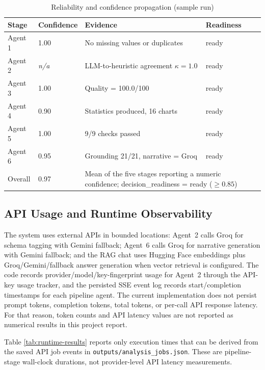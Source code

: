 \documentclass[12pt,a4paper,openany]{report}
\begin{document}
\begin{table}[H]
\centering
\caption{Reliability and confidence propagation (sample run)}
\label{tab:reliability-results}
\begin{tabular}{p{2.5cm} p{2.5cm} p{5.5cm} p{2.5cm}}
\hline
Stage & Confidence & Evidence & Readiness \\
\hline
Agent 1 & 1.00 & No missing values or duplicates & ready \\
Agent 2 & \textit{n/a} & LLM-to-heuristic agreement $\kappa=1.0$ & ready \\
Agent 3 & 1.00 & Quality = 100.0/100 & ready \\
Agent 4 & 0.90 & Statistics produced, 16 charts & ready \\
Agent 5 & 1.00 & 9/9 checks passed & ready \\
Agent 6 & 0.95 & Grounding 21/21, narrative = Groq & ready \\
\hline
Overall & 0.97 & \multicolumn{2}{p{8cm}}{Mean of the five stages reporting a numeric confidence; decision\_readiness = ready ($\ge 0.85$)} \\
\hline
\end{tabular}
\end{table}

\subsection{API Usage and Runtime Observability}
The system uses external APIs in bounded locations: Agent~2 calls Groq for schema tagging with Gemini fallback; Agent~6 calls Groq for narrative generation with Gemini fallback; and the RAG chat uses Hugging Face embeddings plus Groq/Gemini/fallback answer generation when vector retrieval is configured. The code records provider/model/key-fingerprint usage for Agent~2 through the API-key usage tracker, and the persisted SSE event log records start/completion timestamps for each pipeline agent. The current implementation does not persist prompt tokens, completion tokens, total tokens, or per-call API response latency. For that reason, token counts and API latency values are not reported as numerical results in this project report.

Table \ref{tab:runtime-results} reports only execution times that can be derived from the saved API job events in \texttt{outputs/analysis\_jobs.json}. These are pipeline-stage wall-clock durations, not provider-level API latency measurements.
\end{document}
